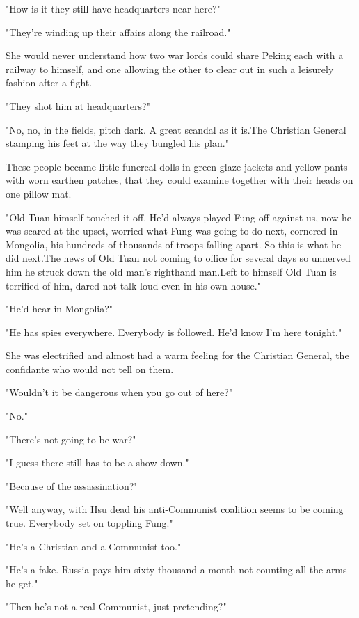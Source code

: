 \par "How is it they still have headquarters near here?"
\par "They're winding up their affairs along the railroad."
\par She would never understand how two war lords could share Peking each with a railway to himself, and one allowing the other to clear out in such a leisurely fashion after a fight.
\par "They shot him at headquarters?"
\par "No, no, in the fields, pitch dark. A great scandal as it is.The Christian General stamping his feet at the way they bungled his plan."
\par These people became little funereal dolls in green glaze jackets and yellow pants with worn earthen patches, that they could examine together with their heads on one pillow mat.
\par "Old Tuan himself touched it off. He'd always played Fung off against us, now he was scared at the upset, worried what Fung was going to do next, cornered in Mongolia, his hundreds of thousands of troops falling apart. So this is what he did next.The news of Old Tuan not coming to office for several days so unnerved him he struck down the old man's righthand man.Left to himself Old Tuan is terrified of him, dared not talk loud even in his own house."
\par "He'd hear in Mongolia?"
\par "He has spies everywhere. Everybody is followed. He'd know I'm here tonight."
\par She was electrified and almost had a warm feeling for the Christian General, the confidante who would not tell on them.
\par "Wouldn't it be dangerous when you go out of here?"
\par "No."
\par "There's not going to be war?"
\par "I guess there still has to be a show-down."
\par "Because of the assassination?"
\par "Well anyway, with Hsu dead his anti-Communist coalition seems to be coming true. Everybody set on toppling Fung."
\par "He's a Christian and a Communist too."
\par "He's a fake. Russia pays him sixty thousand a month not counting all the arms he get."
\par "Then he's not a real Communist, just pretending?"
